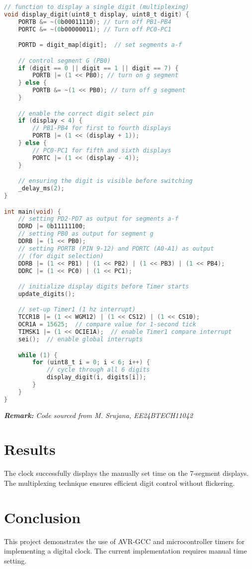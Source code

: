 \documentclass[12pt,a4paper]{article}
\begin{document}
\begin{lstlisting}[language=C, basicstyle=\ttfamily, keywordstyle=\color{blue}, commentstyle=\color{green}]
// function to display a single digit (multiplexing)
void display_digit(uint8_t display, uint8_t digit) {
    PORTB &= ~(0b00011110); // turn off PB1-PB4
    PORTC &= ~(0b00000011); // Turn off PC0-PC1

    PORTD = digit_map[digit];  // set segments a-f

    // control segment G (PB0)
    if (digit == 0 || digit == 1 || digit == 7) {
        PORTB |= (1 << PB0); // turn on g segment
    } else {
        PORTB &= ~(1 << PB0); // turn off g segment
    }

    // enable the correct digit select pin
    if (display < 4) {
        // PB1-PB4 for first to fourth displays
        PORTB |= (1 << (display + 1));
    } else {
        // PC0-PC1 for fifth and sixth displays
        PORTC |= (1 << (display - 4));
    }

    // ensuring the digit is visible before switching
    _delay_ms(2);
}

int main(void) {
    // setting PD2-PD7 as output for segments a-f
    DDRD |= 0b11111100;
    // setting PB0 as output for segment g
    DDRB |= (1 << PB0);
    // setting PORTB (PIN 9-12) and PORTC (A0-A1) as output 
    // (for digit selection)
    DDRB |= (1 << PB1) | (1 << PB2) | (1 << PB3) | (1 << PB4);
    DDRC |= (1 << PC0) | (1 << PC1);

    // initialize display digits before Timer starts
    update_digits();

    // set-up Timer1 (1 hz interrupt)
    TCCR1B |= (1 << WGM12) | (1 << CS12) | (1 << CS10);
    OCR1A = 15625;  // compare value for 1-second tick
    TIMSK1 |= (1 << OCIE1A);  // enable Timer1 compare interrupt
    sei();  // enable global interrupts

    while (1) {
        for (uint8_t i = 0; i < 6; i++) {
            // cycle through all 6 digits
            display_digit(i, digits[i]);
        }
    }
}
\end{lstlisting}
\textit{\textbf{Remark:} Code sourced from M. Srujana, EE24BTECH11042}

\section{Results}
The clock successfully displays the manually set time on the 7-segment displays. The multiplexing technique ensures efficient digit control without flickering.

\section{Conclusion}
This project demonstrates the use of AVR-GCC and microcontroller timers for implementing a digital clock. The current implementation requires manual time setting.
\end{document}
